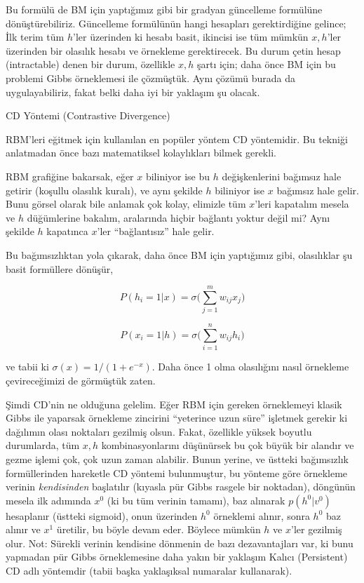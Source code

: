 \documentclass[12pt,fleqn]{article}\usepackage{../../common}
\begin{document}
Bu formülü de BM için yaptığımız gibi bir gradyan güncelleme formülüne
dönüştürebiliriz. Güncelleme formülünün hangi hesapları gerektirdiğine
gelince; İlk terim tüm $h$'ler üzerinden ki hesabı basit, ikincisi ise tüm
mümkün $x,h$'ler üzerinden bir olasılık hesabı ve örnekleme
gerektirecek. Bu durum çetin hesap (intractable) denen bir durum, özellikle
$x,h$ şartı için; daha önce BM için bu problemi Gibbs örneklemesi ile
çözmüştük. Aynı çözümü burada da uygulayabiliriz, fakat belki daha iyi bir
yaklaşım şu olacak.

CD Yöntemi (Contrastive Divergence) 

RBM'leri eğitmek için kullanılan en popüler yöntem CD yöntemidir. Bu
tekniği anlatmadan önce bazı matematiksel kolaylıkları bilmek gerekli.

RBM grafiğine bakarsak, eğer $x$ biliniyor ise bu $h$ değişkenlerini
bağımsız hale getirir (koşullu olasılık kuralı), ve aynı şekilde $h$
biliniyor ise $x$ bağımsız hale gelir. Bunu görsel olarak bile anlamak çok
kolay, elimizle tüm $x$'leri kapatalım mesela ve $h$ düğümlerine bakalım,
aralarında hiçbir bağlantı yoktur değil mi? Aynı şekilde $h$ kapatınca
$x$'ler ``bağlantısız'' hale gelir. 

Bu bağımsızlıktan yola çıkarak, daha önce BM için yaptığımız gibi,
olasılıklar şu basit formüllere dönüşür,

$$ P(h_i=1|x) = \sigma \bigg( \sum _{j=1}^{m} w_{ij} x_j \bigg) $$

$$ P(x_i=1|h) = \sigma \bigg( \sum _{i=1}^{n} w_{ij} h_i \bigg) $$

ve tabii ki $\sigma(x) = 1 / (1+e^{-x})$. Daha önce 1 olma olasılığını
nasıl örnekleme çevireceğimizi de görmüştük zaten. 

Şimdi CD'nin ne olduğuna gelelim. Eğer RBM için gereken örneklemeyi klasik
Gibbs ile yaparsak örnekleme zincirini ``yeterince uzun süre'' işletmek
gerekir ki dağılımın olası noktaları gezilmiş olsun. Fakat, özellikle
yüksek boyutlu durumlarda, tüm $x,h$ kombinasyonlarını düşünürsek bu çok
büyük bir alandır ve gezme işlemi çok, çok uzun zaman alabilir. Bunun
yerine, ve üstteki bağımsızlık formüllerinden hareketle CD yöntemi
bulunmuştur, bu yönteme göre örnekleme verinin {\em kendisinden} başlatılır
(kıyasla pür Gibbs rasgele bir noktadan), döngünün mesela ilk adımında
$x^0$ (ki bu tüm verinin tamamı), baz alınarak $p(h^0|v^0)$ hesaplanır
(üstteki sigmoid), onun üzerinden $h^0$ örneklemi alınır, sonra $h^0$ baz
alınır ve $x^1$ üretilir, bu böyle devam eder. Böylece mümkün $h$ ve
$x$'ler gezilmiş olur. Not: Sürekli verinin kendisine dönmenin de bazı
dezavantajları var, ki bunu yapmadan pür Gibbs örneklemesine daha yakın bir
yaklaşım Kalıcı (Persistent) CD adlı yöntemdir (tabii başka yaklaşıksal
numaralar kullanarak).
\end{document}
